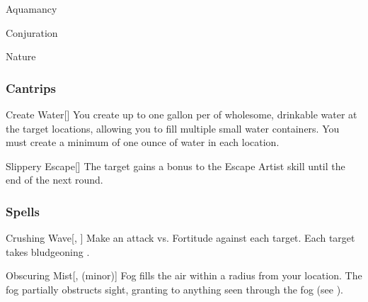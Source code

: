 \newpage
\begin{spellsection}{Aquamancy}

\begin{spellheader}
\end{spellheader}


 Conjuration

 Nature

\subsubsection{Cantrips}


\begin{freeability}{Create Water}[]
You create up to one gallon per  of wholesome, drinkable water at the target locations, allowing you to fill multiple small water containers.
You must create a minimum of one ounce of water in each location.
\end{freeability}


\begin{freeability}{Slippery Escape}[]
The target gains a  bonus to the Escape Artist skill until the end of the next round.
\end{freeability}

\end{spellsection}


\subsubsection{Spells}


\lowercase{\hypertarget{spell:Crushing Wave}{}}\label{spell:Crushing Wave}
\begin{freeability}[\nth{1}]{\hypertarget{spell:Crushing Wave}{Crushing Wave}}[, ]
Make an attack vs. Fortitude against each target.
\hit Each target takes bludgeoning .
\end{freeability}
\vspace{0.25em}



\lowercase{\hypertarget{spell:Obscuring Mist}{}}\label{spell:Obscuring Mist}
\begin{freeability}[\nth{1}]{\hypertarget{spell:Obscuring Mist}{Obscuring Mist}}[,  (minor)]
\targetrule
Fog fills the air within a \areamed radius  from your location.
The fog partially obstructs sight, granting  to anything seen through the fog (see ).
\end{freeability}
\vspace{0.25em}



